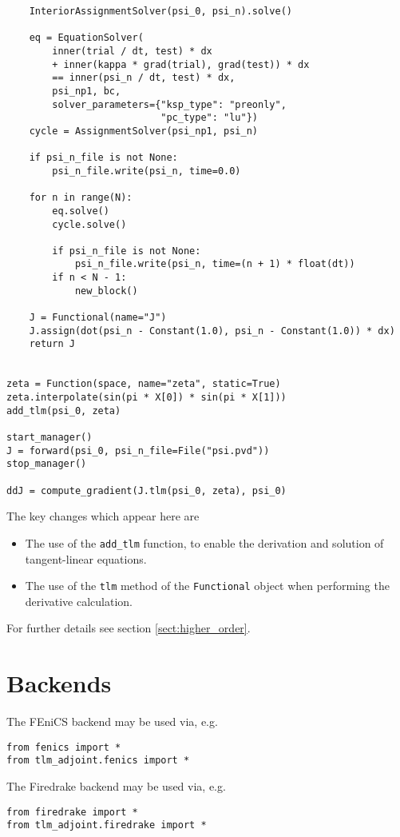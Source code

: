 \documentclass[11pt]{article}
\begin{document}
\begin{lstlisting}
    InteriorAssignmentSolver(psi_0, psi_n).solve()

    eq = EquationSolver(
        inner(trial / dt, test) * dx
        + inner(kappa * grad(trial), grad(test)) * dx
        == inner(psi_n / dt, test) * dx,
        psi_np1, bc,
        solver_parameters={"ksp_type": "preonly",
                           "pc_type": "lu"})
    cycle = AssignmentSolver(psi_np1, psi_n)

    if psi_n_file is not None:
        psi_n_file.write(psi_n, time=0.0)

    for n in range(N):
        eq.solve()
        cycle.solve()

        if psi_n_file is not None:
            psi_n_file.write(psi_n, time=(n + 1) * float(dt))
        if n < N - 1:
            new_block()

    J = Functional(name="J")
    J.assign(dot(psi_n - Constant(1.0), psi_n - Constant(1.0)) * dx)
    return J


zeta = Function(space, name="zeta", static=True)
zeta.interpolate(sin(pi * X[0]) * sin(pi * X[1]))
add_tlm(psi_0, zeta)

start_manager()
J = forward(psi_0, psi_n_file=File("psi.pvd"))
stop_manager()

ddJ = compute_gradient(J.tlm(psi_0, zeta), psi_0)
\end{lstlisting}

The key changes which appear here are
\begin{itemize}
  \item The use of the \texttt{add\_tlm} function, to enable the derivation and
    solution of tangent-linear equations. 
  \item The use of the \texttt{tlm} method of the \texttt{Functional} object
    when performing the derivative calculation.
\end{itemize}
For further details see section \ref{sect:higher_order}.

\section{Backends}\label{sect:backends}

The FEniCS backend may be used via, e.g.
\begin{lstlisting}
from fenics import *
from tlm_adjoint.fenics import *
\end{lstlisting}

The Firedrake backend may be used via, e.g.
\begin{lstlisting}
from firedrake import *
from tlm_adjoint.firedrake import *
\end{lstlisting}
\end{document}

